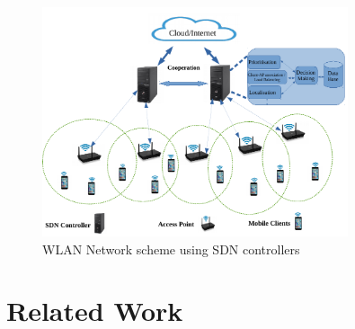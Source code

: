 \documentclass[journal,transmag]{IEEEtran}
\begin{document}
\begin{figure}[t]
\centering \includegraphics[width=9cm]{Figures/SDN_controller} \caption{WLAN Network scheme using SDN controllers}
\label{SDN_based_multi_cell_WLAN} 
\end{figure}


\section{Related Work}
\label{Related_Work}
\end{document}
